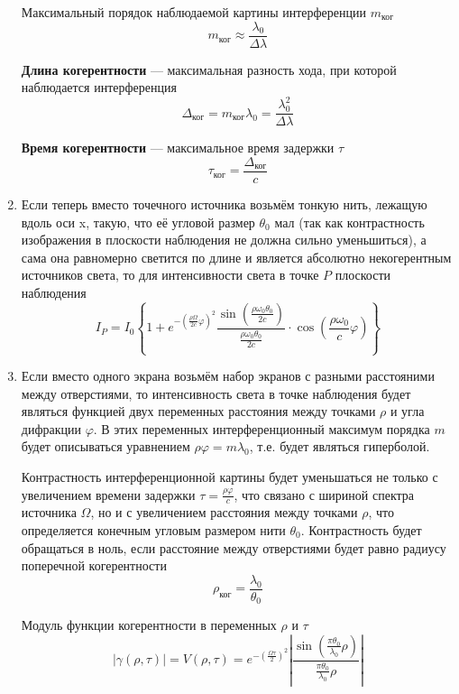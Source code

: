 \documentclass[12pt]{article}
\begin{document}
\begin{enumerate}
			Максимальный порядок наблюдаемой картины интерференции $m_\text{ког}$
\begin{equation}
	m_\text{ког} \approx \frac{\lambda_0}{\Delta \lambda}
\end{equation}		
		\par
			{\bf Длина когерентности} --- максимальная разность хода, при которой наблюдается интерференция
\begin{equation}
	\Delta_\text{ког} = m_\text{ког} \lambda_0 = \frac{\lambda_0^2}{\Delta \lambda}
\end{equation}
		\par
			{\bf Время когерентности} --- максимальное время задержки $\tau$
\begin{equation}
	\tau_\text{ког} = \frac{\Delta_\text{ког}}{c}
\end{equation}
	\item
		\par
			Если теперь вместо точечного источника возьмём тонкую нить, лежащую вдоль оси x, такую, что её угловой размер $\theta_0$ мал (так как контрастность изображения в плоскости наблюдения не должна сильно уменьшиться), а  сама она равномерно светится по длине и является абсолютно некогерентным источников света, то для интенсивности света в точке $P$ плоскости наблюдения
\begin{equation}
	I_P = I_0 \left\lbrace 1 + e^{-\left(\frac{\rho \Omega}{2 c} \varphi\right)^2} \frac{\sin \left(\frac{\rho \omega_0 \theta_0}{2 c} \right)}{\frac{\rho \omega_0 \theta_0}{2 c}} \cdot \cos \left(\frac{\rho \omega_0}{c} \varphi \right) \right\rbrace \label{f1}
\end{equation}
	\item
		\par
		Если вместо одного экрана возьмём набор экранов с разными расстояними между отверстиями, то интенсивность света в точке наблюдения будет являться функцией двух переменных расстояния между точками $\rho$ и угла дифракции $\varphi$. В этих переменных интерференционный максимум порядка $m$ будет описываться уравнением $\rho \varphi = m \lambda_0$, т.е. будет являться гиперболой.
		\par
			Контрастность интерференционной картины будет уменьшаться не только с увеличением времени задержки $\tau = \frac{\rho \varphi}{c}$, что связано с шириной спектра источника $\Omega$, но и с увеличением расстояния между точками $\rho$, что определяется конечным угловым размером нити $\theta_0$. Контрастность будет обращаться в ноль, если расстояние между отверстиями будет равно радиусу поперечной когерентности
\begin{equation}
	\rho_\text{ког} = \frac{\lambda_0}{\theta_0}
\end{equation}
	\par
		Модуль функции когерентности в переменных $\rho$ и $\tau$
\begin{equation}
	|\gamma(\rho, \tau)| = V(\rho, \tau) = e^{-\left(\frac{\Omega \tau}{2} \right)^2} \left|\frac{\sin\left(\frac{\pi \theta_0}{\lambda_0} \rho \right)}{\frac{\pi \theta_0}{\lambda_0} \rho} \right|
\end{equation}
\end{enumerate}		
\newpage
\end{document}
